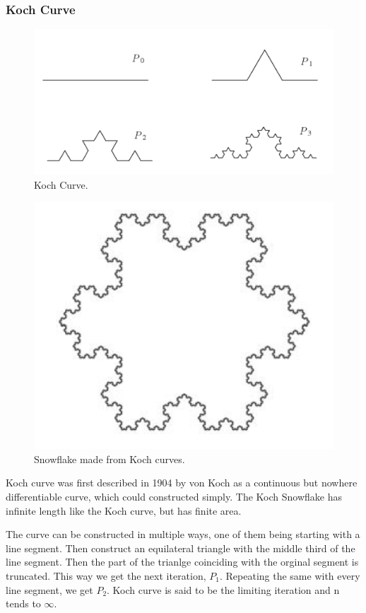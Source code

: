 \subsubsection{Koch Curve}
\begin{figure}[h!]
    \includegraphics[width=\linewidth]{Pictures/koch_curve.png}
    \caption{Koch Curve.}
    \label{fig:cantor_set}
\end{figure}
\begin{figure}[h!]
    \includegraphics[width=\linewidth]{Pictures/snowflake.png}
    \caption{Snowflake made from Koch curves.}
    \label{fig:snowflake}
\end{figure}
Koch curve was first described in 1904 by von Koch as a continuous but nowhere
differentiable curve, which could constructed simply.
The Koch Snowflake has infinite length like the Koch curve, but has finite area.

The curve can be constructed in multiple ways, one of them being starting with
a line segment. Then construct an equilateral triangle with the middle third of
the line segment. Then the part of the trianlge coinciding with the orginal
segment is truncated. This way we get the next iteration, $P_1$. Repeating the
same with every line segment, we get $P_2$. Koch curve is said to be the
limiting iteration and n tends to $\infty$.

